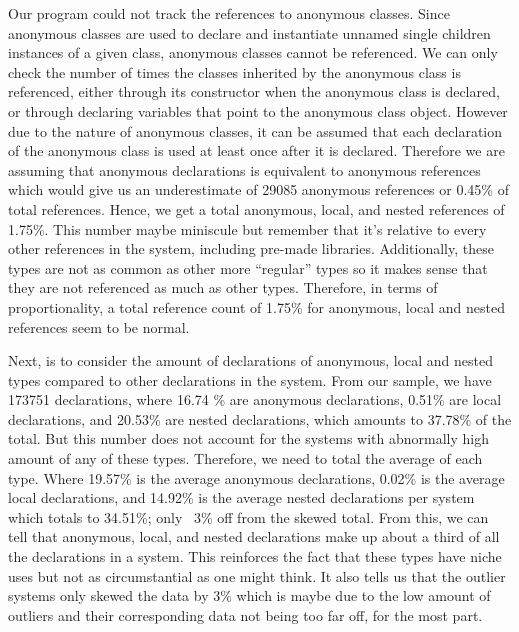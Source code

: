 \documentclass[12p]{article}
\begin{document}
Our program could not track the references to anonymous classes. Since anonymous classes are used to declare and instantiate unnamed single children instances of a given class, anonymous classes cannot be referenced. We can only check the number of times the classes inherited by the anonymous class is referenced, either through its constructor when the anonymous class is declared, or through declaring variables that point to the anonymous class object. However due to the nature of anonymous classes, it can be assumed that each declaration of the anonymous class is used at least once after it is declared. Therefore we are assuming that anonymous declarations is equivalent to anonymous references which would give us an underestimate of 29085 anonymous references or 0.45\% of total references. Hence, we get a total anonymous, local, and nested references of 1.75\%. This number maybe miniscule but remember that it’s relative to every other references in the system, including pre-made libraries. Additionally, these types are not as common as other more “regular” types so it makes sense that they are not referenced as much as other types. Therefore, in terms of proportionality, a total reference count of 1.75\% for anonymous, local and nested references seem to be normal.

Next, is to consider the amount of declarations of anonymous, local and nested types compared to other declarations in the system. From our sample, we have 173751 declarations, where 16.74 \% are anonymous declarations, 0.51\% are local declarations, and 20.53\% are nested declarations, which amounts to 37.78\% of the total. But this number does not account for the systems with abnormally high amount of any of these types. Therefore, we need to total the average of each type. Where 19.57\% is the average anonymous declarations, 0.02\% is the average local declarations, and 14.92\% is the average nested declarations per system which totals to 34.51\%; only ~3\% off from the skewed total. From this, we can tell that anonymous, local, and nested declarations make up about a third of all the declarations in a system. This reinforces the fact that these types have niche uses but not as circumstantial as one might think. It also tells us that the outlier systems only skewed the data by 3\% which is maybe due to the low amount of outliers and their corresponding data not being too far off, for the most part.
\end{document}
